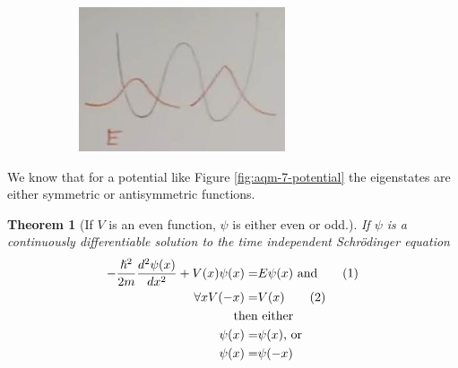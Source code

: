 \documentclass[]{article}
\newcommand\numberthis{\addtocounter{equation}{1}\tag{\theequation}}
\newcommand{\Schr}{{Schr\"odinger }}
\newtheorem{thm}{Theorem}
\begin{document}
\begin{figure}[H]
\begin{subfigure}[t]{0.3\textwidth}
		\includegraphics[width=\textwidth]{particle_mixed}
	\end{subfigure}
\end{figure}

We know that for a potential like Figure \ref{fig:aqm-7-potential} the eigenstates are either symmetric or antisymmetric functions.

\begin{thm}[If $V$ is an even function, $\psi$ is either even or odd.]
	If  $\psi$  is a continuously differentiable solution to the time independent \Schr equation
	\begin{align*}
	-\frac{\hslash^2}{2m}\frac{d^2 \psi(x)}{d x^2} + V(x)\psi(x) =& E\psi(x) \text{ and}\numberthis \label{eq:ti:schroedinger}\\
	\forall x V(-x) =& V(x) \numberthis \label{eq:even_V}\\
	\text{then}&\text{ either}\\
	\psi(x) =& \psi(x)\text{, or}\\
	\psi(x) =& \psi(-x)
	\end{align*}
\end{thm}
\end{document}
